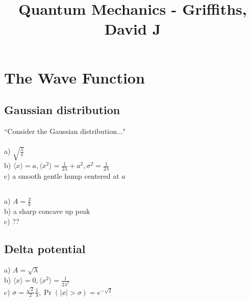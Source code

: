 \documentclass{article}
\title{Quantum Mechanics - Griffiths, David J}
\date{}
\newcommand{\<}{\langle}
\renewcommand{\>}{\rangle}
\begin{document}
\maketitle

\section{The Wave Function}

\subsection{}
\subsection{}
\subsection{Gaussian distribution}
``Consider the Gaussian distribution..." 
\\ \\
a) $\sqrt{\frac{\lambda}{\pi}}$ \\
b) $\<x\> = a, \<x^2\> = \frac{1}{2\lambda} + a^2, \sigma^2 = \frac{1}{2\lambda}$ \\
c) a smooth gentle hump centered at $a$
\subsection{}
a) $A = \frac{2}{b}$ \\
b) a sharp concave up peak \\
c) ??
\subsection{Delta potential}
a) $A = \sqrt{\lambda}$ \\
b) $\<x\> = 0, \<x^2\> = \frac{1}{2\lambda^2}$ \\
c) $\sigma = \frac{\sqrt 2}{2} \frac{1}{\lambda}, \Pr(|x| > \sigma) = e^{-\sqrt{2}}$
\subsection{}
\subsection{}
\subsection{}
\end{document}
